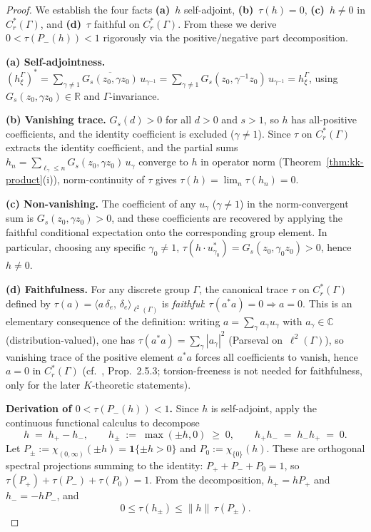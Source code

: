 \begin{proof}
We establish the four facts
\textbf{(a)}~$h$ self-adjoint,
\textbf{(b)}~$\tau(h) = 0$,
\textbf{(c)}~$h \ne 0$ in $C^*_r(\Gamma)$, and
\textbf{(d)}~$\tau$ faithful on $C^*_r(\Gamma)$.
From these we derive $0 < \tau(P_-(h)) < 1$ rigorously via
the positive/negative part decomposition.

\textbf{(a) Self-adjointness.}
$(h_\xi^\Gamma)^* = \sum_{\gamma \ne 1}
\overline{G_s(z_0, \gamma z_0)}\, u_{\gamma^{-1}}
= \sum_{\gamma \ne 1} G_s(z_0, \gamma^{-1} z_0)\, u_{\gamma^{-1}}
= h_\xi^\Gamma$, using $G_s(z_0, \gamma z_0) \in \mathbb{R}$
and $\Gamma$-invariance.

\textbf{(b) Vanishing trace.}
$G_s(d) > 0$ for all $d > 0$ and $s > 1$, so
$h$ has all-positive coefficients, and the identity
coefficient is excluded ($\gamma \ne 1$).
Since $\tau$ on $C^*_r(\Gamma)$ extracts the identity
coefficient, and the partial sums $h_n =
\sum_{\ell_\gamma \le n} G_s(z_0,\gamma z_0)\,u_\gamma$
converge to $h$ in operator norm
(Theorem~\ref{thm:kk-product}(i)), norm-continuity of
$\tau$ gives $\tau(h) = \lim_n \tau(h_n) = 0$.

\textbf{(c) Non-vanishing.}
The coefficient of any $u_\gamma$ ($\gamma \ne 1$) in the
norm-convergent sum is $G_s(z_0, \gamma z_0) > 0$, and
these coefficients are recovered by applying the
faithful conditional expectation onto the corresponding
group element.  In particular, choosing any specific
$\gamma_0 \ne 1$, $\tau(h \cdot u_{\gamma_0}^*) = G_s(z_0,
\gamma_0 z_0) > 0$, hence $h \ne 0$.

\textbf{(d) Faithfulness.}
For any discrete group $\Gamma$, the canonical trace $\tau$
on $C^*_r(\Gamma)$ defined by
$\tau(a) = \langle a\,\delta_e,\,\delta_e\rangle_{\ell^2(\Gamma)}$
is \emph{faithful}: $\tau(a^* a) = 0 \Rightarrow a = 0$.
This is an elementary consequence of the definition: writing
$a = \sum_\gamma a_\gamma u_\gamma$ with $a_\gamma \in
\mathbb{C}$ (distribution-valued), one has
$\tau(a^* a) = \sum_\gamma |a_\gamma|^2$
(Parseval on~$\ell^2(\Gamma)$), so vanishing trace of the
positive element $a^* a$ forces all coefficients to vanish,
hence $a = 0$ in $C^*_r(\Gamma)$
(cf.\ \citealt{BrownOzawa2008}, Prop.~2.5.3; torsion-freeness
is not needed for faithfulness, only for the later
$K$-theoretic statements).

\textbf{Derivation of $0 < \tau(P_-(h)) < 1$.}
Since $h$ is self-adjoint, apply the continuous functional
calculus to decompose
\[
  h \;=\; h_+ - h_-,
  \qquad
  h_\pm \;:=\; \max(\pm h, 0) \;\ge\; 0,
  \qquad
  h_+ h_- \;=\; h_- h_+ \;=\; 0.
\]
Let $P_\pm := \chi_{(0, \infty)}(\pm h) = \mathbf{1}\{\pm h > 0\}$
and $P_0 := \chi_{\{0\}}(h)$.  These are orthogonal spectral
projections summing to the identity: $P_+ + P_- + P_0 = 1$,
so $\tau(P_+) + \tau(P_-) + \tau(P_0) = 1$.
From the decomposition, $h_+ = h P_+$ and $h_- = -h P_-$, and
\begin{equation}\label{eq:h-pm-trace-bound}
  0 \le \tau(h_\pm) \le \|h\|\,\tau(P_\pm).
\end{equation}


\end{proof}
